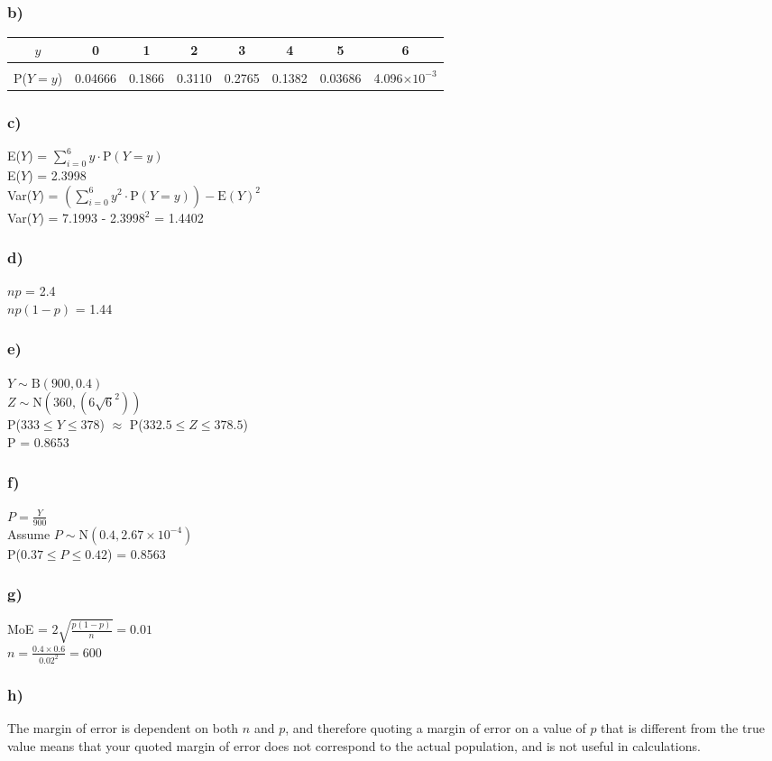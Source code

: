 \documentclass[]{article}
\begin{document}
\subsubsection{b)}
\begin{tabular}{c|c|c|c|c|c|c|c}
    $y$&0&1&2&3&4&5&6\\
    \hline
    \\[\dimexpr-\normalbaselineskip+4pt]
    P($Y=y$)&0.04666&0.1866&0.3110&0.2765&0.1382&0.03686&4.096$\times10^{-3}$
\end{tabular}
\subsubsection{c)}
E($Y$) = $\sum_{i=0}^{6} y \cdot \textrm{P}(Y=y)$
\\
E($Y$) = 2.3998 
\\
Var($Y$) = $\left(\sum_{i=0}^{6} y^2 \cdot \textrm{P}(Y=y)\right) - \textrm{E}(Y)^2$
\\
Var($Y$) = 7.1993 - 2.3998$^2$ = 1.4402
\subsubsection{d)}
$np$ = 2.4
\\
$np(1-p)$ = 1.44
\subsubsection{e)}
$Y \sim \textrm{B}(900,0.4)$
\\
$Z \sim \textrm{N}(360,(6\sqrt{6}^2))$
\\
P($333 \leq Y \leq 378$) $\approx$ P($332.5 \leq Z \leq 378.5$)
\\
P = 0.8653
\subsubsection{f)}
$P = \frac{Y}{900}$
\\
Assume $P \sim \textrm{N}(0.4, 2.67\times 10^{-4})$
\\
P($0.37 \leq P \leq 0.42$) = 0.8563
\subsubsection{g)}
MoE = $2\sqrt{\frac{p(1-p)}{n}} = 0.01$
\\
$n = \frac{0.4\times0.6}{0.02^2} = 600$
\subsubsection{h)}
The margin of error is dependent on both $n$ and $p$, and therefore quoting a margin of error on a value of $p$ that is different from the true value means that your quoted margin of error does not correspond to the actual population, and is not useful in calculations.
\end{document}
